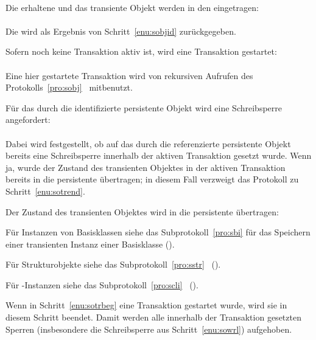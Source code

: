 \begin{infol}
\begin{block}
\begin{block}
\\
Die erhaltene \sobjid\/ und das transiente Objekt werden in den
\cache\/ eingetragen:\\
\\
Die \sobjid\/ wird als Ergebnis von Schritt~\ref{enu:sobjid}
zur\"{u}ckgegeben.
%
\end{block}%
%
\item\label{enu:sotrbeg} Sofern noch keine Transaktion aktiv ist, wird
eine Transaktion gestartet:\\
\\
Eine hier gestartete Transaktion wird von rekursiven Aufrufen des
Protokolls~\ref{pro:sobj} \ mitbenutzt.
%
\item\label{enu:sowrl} F\"{u}r das durch die \sobjid\/ identifizierte
persistente Objekt wird eine Schreibsperre angefordert:\\
\\
Dabei wird festgestellt, ob auf das durch die \sobjid\/ referenzierte
persistente Objekt bereits eine Schreibsperre innerhalb der
aktiven Transaktion gesetzt wurde. Wenn ja, wurde der Zustand des
transienten Objektes in der aktiven Transaktion bereits in die
persistente \representation{} \"{u}ber\-tra\-gen; in diesem Fall verzweigt
das Protokoll zu Schritt~\ref{enu:sotrend}.
%
\item Der Zustand des transienten Objektes wird in die persistente
\representation{} \"{u}bertragen:
%
\begin{block}%
%
\item F\"{u}r Instanzen von Basisklassen siehe das
Subprotokoll~\ref{pro:sbi} f\"{u}r das Speichern einer transienten
Instanz einer Basisklasse (\citepage{\pageref{pro:sbi}}).
%
\item F\"{u}r Strukturobjekte siehe das Subprotokoll~\ref{pro:sstr}
\ (\citepage{\pageref{pro:sstr}}).
%
\item F\"{u}r \clos-Instanzen siehe das Subprotokoll~\ref{pro:scli}
\ (\citepage{\pageref{pro:scli}}).
%
\end{block}%
%
\item\label{enu:sotrend} Wenn in Schritt~\ref{enu:sotrbeg} eine
Transaktion gestartet wurde, wird sie in diesem Schritt beendet. Damit
werden alle innerhalb der Transaktion gesetzten Sperren
(insbesondere die Schreibsperre aus Schritt~\ref{enu:sowrl})
aufgehoben.

\end{block}
\end{infol}

